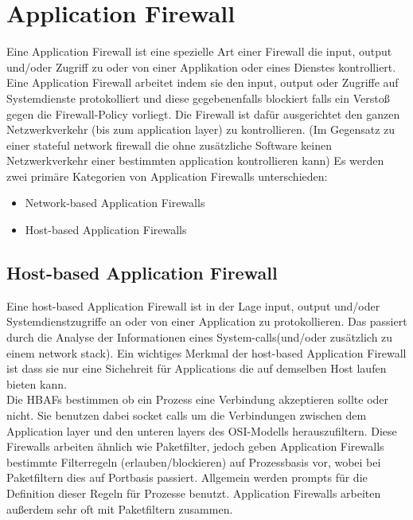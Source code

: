 \documentclass[11pt]{scrartcl}
\begin{document}
\section{Application Firewall}
\label{sec:application firewall}
Eine Application Firewall ist eine spezielle Art einer Firewall die input, output und/oder Zugriff zu oder von einer Applikation oder eines Dienstes kontrolliert. Eine Application Firewall arbeitet indem sie den input, output oder Zugriffe auf Systemdienste protokolliert und diese gegebenenfalls blockiert falls ein Verstoß gegen die Firewall-Policy vorliegt. Die Firewall ist dafür ausgerichtet den ganzen Netzwerkverkehr (bis zum application layer) zu kontrollieren. (Im Gegensatz zu einer stateful network firewall die ohne zusätzliche Software keinen Netzwerkverkehr einer bestimmten application kontrollieren kann)
Es werden zwei primäre Kategorien von Application Firewalls unterschieden:
\begin{itemize}
\item Network-based Application Firewalls
\item Host-based Application Firewalls
\end{itemize}

\subsection{Host-based Application Firewall}
\label{sec:host-based application firewall}
Eine host-based Application Firewall ist in der Lage input, output und/oder Systemdienstzugriffe an oder von einer Application zu protokollieren. Das passiert durch die Analyse der Informationen eines System-calls(und/oder zusätzlich zu einem network stack). Ein wichtiges Merkmal der host-based Application Firewall ist dass sie nur eine Sichehreit für Applications die auf demselben Host laufen bieten kann.\\

Die HBAFs bestimmen ob ein Prozess eine Verbindung akzeptieren sollte oder nicht. Sie benutzen dabei socket calls um die Verbindungen zwischen dem Application layer und den unteren layers des OSI-Modells herauszufiltern. Diese Firewalls arbeiten ähnlich wie Paketfilter, jedoch geben Application Firewalls bestimmte Filterregeln (erlauben/blockieren) auf Prozessbasis vor, wobei bei Paketfiltern dies auf Portbasis passiert. Allgemein werden prompts für die Definition dieser Regeln für Prozesse benutzt. Application Firewalls arbeiten außerdem sehr oft mit Paketfiltern zusammen.\\
\end{document}
